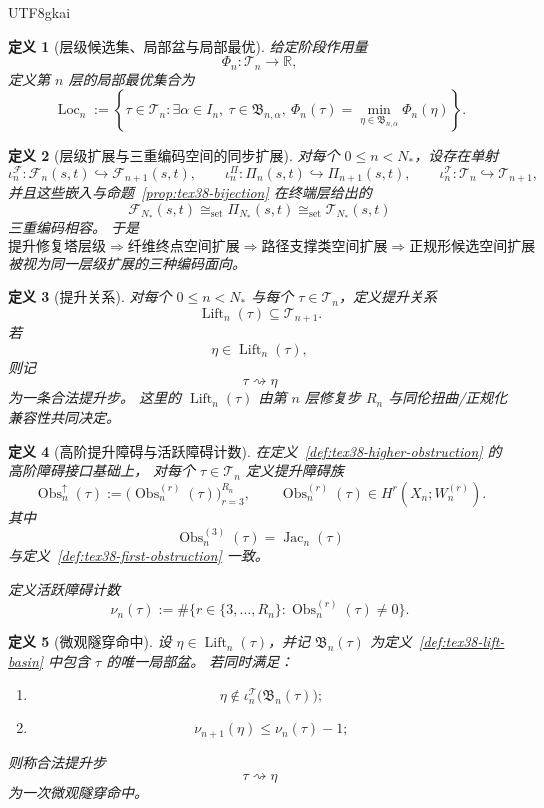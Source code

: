 \documentclass[12pt]{article}
\newtheorem{definition}{定义}[section]
\newcommand{\RR}{\mathbb{R}}
\newcommand{\Jac}{\operatorname{Jac}}
\newcommand{\Obs}{\operatorname{Obs}}
\newcommand{\Lift}{\operatorname{Lift}}
\begin{document}
\begin{CJK*}{UTF8}{gkai}
\begin{definition}[层级候选集、局部盆与局部最优]
给定阶段作用量
\[
  \Phi_n:\mathcal T_n\to\RR,
\]
定义第 $n$ 层的局部最优集合为
\[
  \operatorname{Loc}_n
  :=
  \left\{
    \tau\in\mathcal T_n:
    \exists \alpha\in I_n,\
    \tau\in\mathfrak B_{n,\alpha},\
    \Phi_n(\tau)=\min_{\eta\in\mathfrak B_{n,\alpha}}\Phi_n(\eta)
  \right\}.
\]
\end{definition}

\begin{definition}[层级扩展与三重编码空间的同步扩展]
\label{def:tex38-lift-expansion}
对每个 $0\le n<N_\ast$，设存在单射
\[
  \iota_n^{\mathcal F}:\mathcal F_n(s,t)\hookrightarrow \mathcal F_{n+1}(s,t),
  \qquad
  \iota_n^\Pi:\Pi_n(s,t)\hookrightarrow \Pi_{n+1}(s,t),
  \qquad
  \iota_n^{\mathcal T}:\mathcal T_n\hookrightarrow \mathcal T_{n+1},
\]
并且这些嵌入与命题~\ref{prop:tex38-bijection} 在终端层给出的
\[
  \mathcal F_{N_\ast}(s,t)
  \cong_{\mathrm{set}}
  \Pi_{N_\ast}(s,t)
  \cong_{\mathrm{set}}
  \mathcal T_{N_\ast}(s,t)
\]
三重编码相容。
于是
\[
  \text{提升修复塔层级}
  \Longrightarrow
  \text{纤维终点空间扩展}
  \Longrightarrow
  \text{路径支撑类空间扩展}
  \Longrightarrow
  \text{正规形候选空间扩展}
\]
被视为同一层级扩展的三种编码面向。
\end{definition}

\begin{definition}[提升关系]
\label{def:tex38-lift-relation}
对每个 $0\le n<N_\ast$ 与每个 $\tau\in\mathcal T_n$，定义提升关系
\[
  \Lift_n(\tau)\subseteq \mathcal T_{n+1}.
\]
若
\[
  \eta\in\Lift_n(\tau),
\]
则记
\[
  \tau\rightsquigarrow \eta
\]
为一条\emph{合法提升步}。
这里的 $\Lift_n(\tau)$ 由第 $n$ 层修复步 $R_n$ 与同伦扭曲/正规化兼容性共同决定。
\end{definition}

\begin{definition}[高阶提升障碍与活跃障碍计数]
\label{def:tex38-lift-obstruction}
在定义~\ref{def:tex38-higher-obstruction} 的高阶障碍接口基础上，
对每个 $\tau\in\mathcal T_n$ 定义提升障碍族
\[
  \Obs_n^\uparrow(\tau)
  :=
  \bigl(\Obs_n^{(r)}(\tau)\bigr)_{r=3}^{R_n},
  \qquad
  \Obs_n^{(r)}(\tau)\in H^r(X_n;W_n^{(r)}).
\]
其中
\[
  \Obs_n^{(3)}(\tau)=\Jac_n(\tau)
\]
与定义~\ref{def:tex38-first-obstruction} 一致。

定义活跃障碍计数
\[
  \nu_n(\tau)
  :=
  \#\bigl\{
    r\in\{3,\dots,R_n\}:\Obs_n^{(r)}(\tau)\neq 0
  \bigr\}.
\]
\end{definition}

\begin{definition}[微观隧穿命中]
\label{def:tex38-micro-hit}
设 $\eta\in\Lift_n(\tau)$，并记 $\mathfrak B_n(\tau)$ 为定义~\ref{def:tex38-lift-basin} 中包含 $\tau$ 的唯一局部盆。
若同时满足：
\begin{enumerate}
  \item
  \[
    \eta\notin \iota_n^{\mathcal T}\bigl(\mathfrak B_n(\tau)\bigr);
  \]
  \item
  \[
    \nu_{n+1}(\eta)\le \nu_n(\tau)-1;
  \]
\end{enumerate}
则称合法提升步
\[
  \tau\rightsquigarrow \eta
\]
为一次\emph{微观隧穿命中}。
\end{definition}


\end{CJK*}
\end{document}
